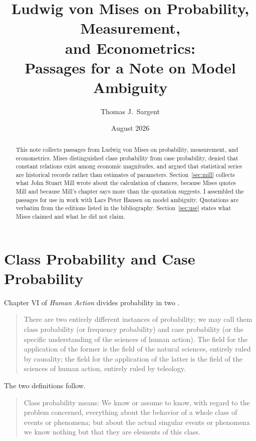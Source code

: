 \documentclass[12pt]{article}
\title{Ludwig von Mises on Probability, Measurement,\\
       and Econometrics:\\
       Passages for a Note on Model Ambiguity}
\author{Thomas J.\ Sargent}
\date{August 2026}
\begin{document}
\maketitle

\begin{abstract}
This note collects passages from Ludwig von Mises on probability, measurement,
and econometrics.  Mises distinguished class probability from case probability,
denied that constant relations exist among economic magnitudes, and argued that
statistical series are historical records rather than estimates of parameters.
Section~\ref{sec:mill} collects what John Stuart Mill wrote about the
calculation of chances, because Mises quotes Mill and because Mill's chapter
says more than the quotation suggests.
I assembled the passages for use in work with Lars Peter Hansen on model
ambiguity.  Quotations are verbatim from the editions listed in the
bibliography.  Section~\ref{sec:use} states what Mises claimed and what he did
not claim.
\end{abstract}

\section{Class Probability and Case Probability}
\label{sec:probability}

Chapter VI of \emph{Human Action} divides probability in two
\citep[pp.~105--118]{Mises1998HumanAction}.

\begin{quote}
There are two entirely different instances of probability; we may call them
class probability (or frequency probability) and case probability (or the
specific understanding of the sciences of human action).  The field for the
application of the former is the field of the natural sciences, entirely ruled
by causality; the field for the application of the latter is the field of the
sciences of human action, entirely ruled by teleology.
\hfill \citep[p.~107]{Mises1998HumanAction}
\end{quote}

The two definitions follow.

\begin{quote}
Class probability means: We know or assume to know, with regard to the problem
concerned, everything about the behavior of a whole class of events or
phenomena; but about the actual singular events or phenomena we know nothing
but that they are elements of this class.
\hfill \citep[p.~107]{Mises1998HumanAction}
\end{quote}
\end{document}

